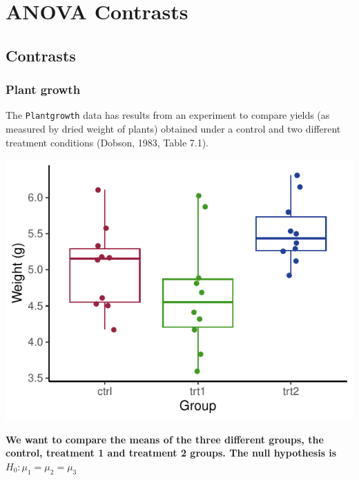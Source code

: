 \documentclass[a4paper]{article}
\begin{document}
\section{ANOVA Contrasts}\label{sec:21}
\subsection{Contrasts}
\subsubsection{Plant growth}
The \lstinline|Plantgrowth| data has results from an experiment to compare yields (as measured by dried weight of plants) obtained under a control and two different treatment conditions (Dobson, 1983, Table 7.1).
\begin{Schunk}


{\centering \includegraphics[width=\maxwidth]{figure/listings-unnamed-chunk-226-1} 

}

\end{Schunk}
\begin{greenbox}
	\textbf{We want to compare the means of the three different groups, the control, treatment 1 and treatment 2 groups. The null hypothesis is} \( H_0: \mu_1 = \mu_2 = \mu_3 \)
\end{greenbox}
\end{document}
